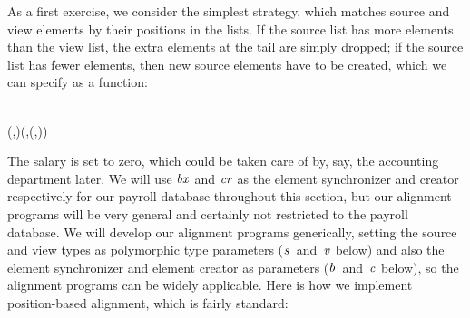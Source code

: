 As a first exercise, we consider the simplest strategy, which matches source and view elements by their positions in the lists.
If the source list has more elements than the view list, the extra elements at the tail are simply dropped; if the source list has fewer elements, then new source elements have to be created, which we can specify as a function:
\begin{hscode}\SaveRestoreHook
{}%
%
\>[B]{}\mathbin{::}\to {}\<[E]%
\\
\>[B]{}\;(,)\mathrel{=}(,(,)){}\<[E]%
\ColumnHook
\end{hscode}\resethooks
The salary is set to zero, which could be taken care of by, say, the accounting department later.
We will use \ensuremath{\Varid{bx}} and \ensuremath{\Varid{cr}} as the element synchronizer and creator respectively for our payroll database throughout this section, but our alignment programs will be very general and certainly not restricted to the payroll database.
We will develop our alignment programs generically, setting the source and view types as polymorphic type parameters (\ensuremath{\Varid{s}}~and~\ensuremath{\Varid{v}} below) and also the element synchronizer and element creator as parameters (\ensuremath{\Varid{b}}~and~\ensuremath{\Varid{c}} below), so the alignment programs can be widely applicable.
Here is how we implement position-based alignment, which is fairly standard:
